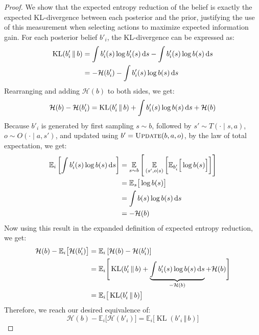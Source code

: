 \begin{proof}
    We show that the expected entropy reduction of the belief is exactly the expected KL-divergence between each posterior and the prior, justifying the use of this measurement when selecting actions to maximize expected information gain.
    For each posterior belief $b'_i$, the KL-divergence can be expressed as:
    \begin{align}
        \operatorname{KL}(b'_i \,\Vert\, b) &= \int b'_i(s) \log b'_i(s) \mathop{}\!\mathrm{d} s - \int b'_i(s) \log b(s) \mathop{}\!\mathrm{d} s \\
            &= -\mathcal{H}(b'_i) - \int b'_i(s) \log b(s) \mathop{}\!\mathrm{d} s
    \end{align}
    Rearranging and adding $\mathcal{H}(b)$ to both sides, we get:
    \begin{equation}
        \mathcal{H}(b) - \mathcal{H}(b'_i) = \operatorname{KL}(b'_i \,\Vert\, b) + \int b'_i(s) \log b(s) \mathop{}\!\mathrm{d} s + \mathcal{H}(b)
    \end{equation}
    Because $b'_i$ is generated by first sampling $s \sim b$, followed by $s' \sim T(\cdot \mid s, a)$, $o \sim O(\cdot \mid a, s')$, and updated using $b' = \textsc{Update}(b, a, o)$, by the law of total expectation, we get:
    \begin{align}
        \mathbb{E}_i\left[ \int b'_i(s) \log b(s) \mathop{}\!\mathrm{d} s \right] &= \operatorname*{\mathbb{E}}_{s \sim b} \Bigg[ \operatorname*{\mathbb{E}}_{(s',o \mid s)} \bigg[ \mathbb{E}_{b'_i} \Big[\log b(s)\Big] \bigg] \Bigg] \\
            &= \mathbb{E}_{s}\big[ \log b(s) \big] \\
            &= \int b(s) \log b(s) \mathop{}\!\mathrm{d} s \\
            &= -\mathcal{H}(b)
    \end{align}
    Now using this result in the expanded definition of expected entropy reduction, we get:
    \begin{align}
        \mathcal{H}(b) - \mathbb{E}_i\big[\mathcal{H}(b'_i)\big] &= \mathbb{E}_i \left[ \mathcal{H}(b) - \mathcal{H}(b'_i) \right] \\
            &= \mathbb{E}_i \Bigg[ \operatorname{KL}(b'_i \,\Vert\, b) + \underbrace{\int b'_i(s) \log b(s) \mathop{}\!\mathrm{d} s}_{-\mathcal{H}(b)} + \mathcal{H}(b) \Bigg] \\
            &= \mathbb{E}_i \big[ \operatorname{KL}(b'_i \,\Vert\, b) \big]
    \end{align}
    Therefore, we reach our desired equivalence of:
    \begin{equation}
        \mathcal{H}(b) - \mathbb{E}_i\big[\mathcal{H}(b'_i)\big] = \mathbb{E}_i \big[ \operatorname{KL}(b'_i \,\Vert\, b) \big]
    \end{equation}
\end{proof}

